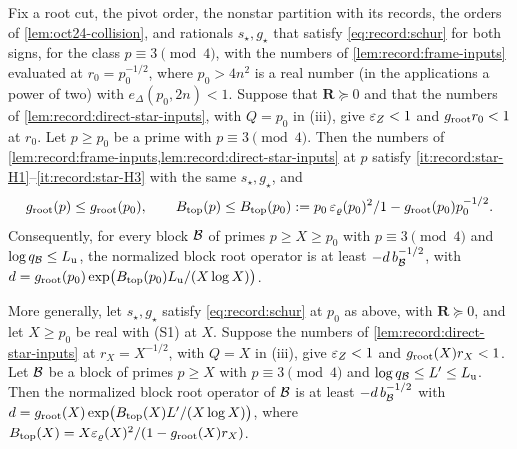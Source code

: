 \begin{lemma}\label{lem:record:monotone-endpoint}
Fix a root cut, the pivot order, the nonstar partition with its records, the
orders of \cref{lem:oct24-collision}, and rationals $s_\star,g_\star$ that satisfy
\eqref{eq:record:schur} for both signs, for the class $p\equiv3\pmod4$, with the
numbers of \cref{lem:record:frame-inputs} evaluated at $r_0=p_0^{-1/2}$, where
$p_0>4n^2$ is a real number (in the applications a power of two) with
$e_\Delta(p_0,2n)<1$. Suppose that $\mathbf R\succeq0$ and that the numbers of
\cref{lem:record:direct-star-inputs}, with $Q=p_0$ in (iii), give $\varepsilon_Z<1$ and
$g_{\rm root}r_0<1$ at $r_0$. Let $p\ge p_0$ be a prime with $p\equiv3\pmod4$. Then
the numbers of \cref{lem:record:frame-inputs,lem:record:direct-star-inputs} at $p$
satisfy \ref{it:record:star-H1}--\ref{it:record:star-H3} with the same
$s_\star,g_\star$, and
\[
 g_{\rm root}(p)\le g_{\rm root}(p_0),\qquad
 B_{\rm top}(p)\le B_{\rm top}(p_0):=p_0\,\varepsilon_\varrho(p_0)^2/1-g_{\rm root}(p_0)p_0^{-1/2} .
\]
Consequently, for every block $\mathcal B$ of primes $p\ge X\ge p_0$ with
$p\equiv3\pmod4$ and $\log q_\mathcal B\le L_{\rm u}$, the normalized block root operator
is at least $-d\,b_\mathcal B^{-1/2}$, with $d=g_{\rm root}(p_0)\exp\bigl(B_{\rm top}(p_0)
L_{\rm u}/(X\log X)\bigr)$.

More generally, let $s_\star,g_\star$ satisfy \eqref{eq:record:schur} at $p_0$ as
above, with $\mathbf R\succeq0$, and let $X\ge p_0$ be real with (S1) at $X$.
Suppose the numbers of \cref{lem:record:direct-star-inputs} at $r_X=X^{-1/2}$, with
$Q=X$ in (iii), give $\varepsilon_Z<1$ and $g_{\rm root}(X)r_X<1$. Let $\mathcal B$ be a block of
primes $p\ge X$ with $p\equiv3\pmod4$ and $\log q_\mathcal B\le L'\le L_{\rm u}$. Then the
normalized block root operator of $\mathcal B$ is at least $-d\,b_\mathcal B^{-1/2}$ with
$d=g_{\rm root}(X)\exp\bigl(B_{\rm top}(X)L'/(X\log X)\bigr)$, where
$B_{\rm top}(X)=X\varepsilon_\varrho(X)^2/(1-g_{\rm root}(X)r_X)$.
\end{lemma}

